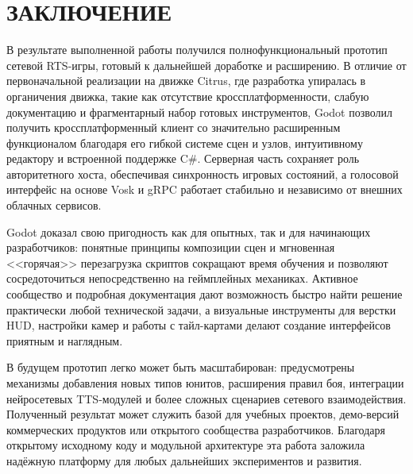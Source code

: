 \section*{ЗАКЛЮЧЕНИЕ}

В результате выполненной работы получился полнофункциональный прототип сетевой RTS-игры, готовый к дальнейшей доработке и расширению. В отличие от первоначальной реализации на движке Citrus, где разработка упиралась в органичения движка, такие как отсутствие кроссплатформенности, слабую документацию и фрагментарный набор готовых инструментов, Godot позволил получить кроссплатформенный клиент со значительно расширенным функционалом благодаря его гибкой системе сцен и узлов, интуитивному редактору и встроенной поддержке C\#. Серверная часть сохраняет роль авторитетного хоста, обеспечивая синхронность игровых состояний, а голосовой интерфейс на основе Vosk и gRPC работает стабильно и независимо от внешних облачных сервисов.

Godot доказал свою пригодность как для опытных, так и для начинающих разработчиков: понятные принципы композиции сцен и мгновенная <<горячая>> перезагрузка скриптов сокращают время обучения и позволяют сосредоточиться непосредственно на геймплейных механиках. Активное сообщество и подробная документация дают возможность быстро найти решение практически любой технической задачи, а визуальные инструменты для верстки HUD, настройки камер и работы с тайл-картами делают создание интерфейсов приятным и наглядным.

В будущем прототип легко может быть масштабирован: предусмотрены механизмы добавления новых типов юнитов, расширения правил боя, интеграции нейросетевых TTS-модулей и более сложных сценариев сетевого взаимодействия. Полученный результат может служить базой для учебных проектов, демо-версий коммерческих продуктов или открытого сообщества разработчиков. Благодаря открытому исходному коду и модульной архитектуре эта работа заложила надёжную платформу для любых дальнейших экспериментов и развития.